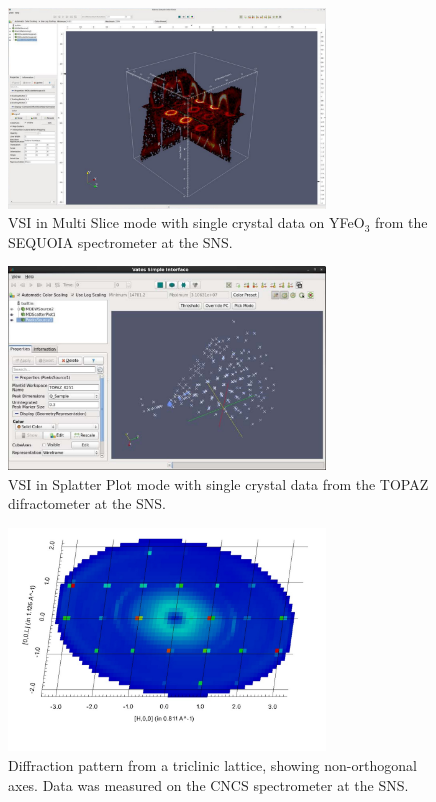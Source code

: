 \documentclass[1p]{elsarticle}
\begin{document}
\begin{figure}[ht]
\centerline{\includegraphics[width=0.75\textwidth]{VSISlices.pdf}}
\caption{VSI in Multi Slice mode with single crystal data on YFeO$_3$ from the SEQUOIA spectrometer at the SNS.}
\label{fig:VSI_slice}
\end{figure}

\begin{figure}[!ht]
\centerline{\includegraphics[width=0.75\textwidth]{VSISplatterPlot.pdf}}
\caption{VSI in Splatter Plot mode with single crystal data from the TOPAZ difractometer at the SNS.}
\label{fig:VSI_sample}
\end{figure}

\begin{figure}[!ht]
\centerline{\includegraphics[width=0.75\textwidth]{NonOrthogonal.pdf}}
\caption{Diffraction pattern from a triclinic lattice, showing non-orthogonal axes. Data was measured on the CNCS spectrometer at the SNS.}
\label{fig:ParaView_sample}
\end{figure}
\end{document}
